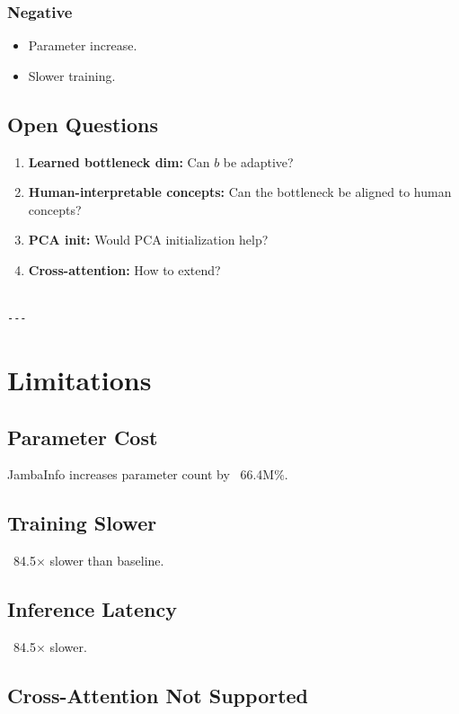 \subsubsection{Negative}
\begin{itemize}
\item Parameter increase.
\item Slower training.

\end{itemize}
\subsection{Open Questions}

\begin{enumerate}
\item \textbf{Learned bottleneck dim:} Can $b$ be adaptive?
\item \textbf{Human-interpretable concepts:} Can the bottleneck be aligned to human concepts?
\item \textbf{PCA init:} Would PCA initialization help?
\item \textbf{Cross-attention:} How to extend?
\end{enumerate}
\begin{lstlisting}

---
\end{lstlisting}

\section{Limitations}

\subsection{Parameter Cost}

JambaInfo increases parameter count by ~66.4M\%.

\subsection{Training Slower}

~84.5$\times$ slower than baseline.

\subsection{Inference Latency}

~84.5$\times$ slower.

\subsection{Cross-Attention Not Supported}

